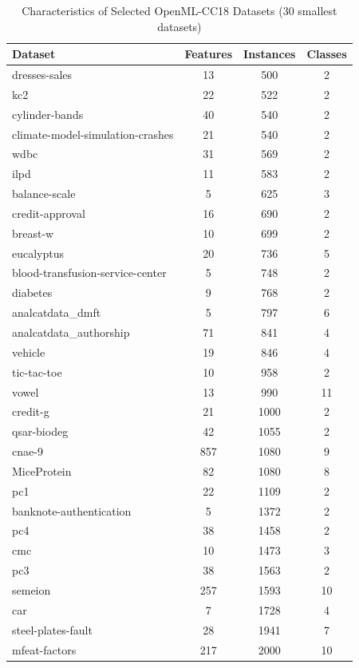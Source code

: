 \documentclass[12pt]{article}
\begin{document}
\begin{table}[ht]
\centering
\footnotesize
\caption{Characteristics of Selected OpenML-CC18 Datasets (30 smallest datasets)}
\label{tab:datasets}
\begin{tabular}{@{}lccc@{}}
\toprule
Dataset & Features & Instances & Classes \\
\midrule
dresses-sales & 13 & 500 & 2 \\
kc2 & 22 & 522 & 2 \\
cylinder-bands & 40 & 540 & 2 \\
climate-model-simulation-crashes & 21 & 540 & 2 \\
wdbc & 31 & 569 & 2 \\
ilpd & 11 & 583 & 2 \\
balance-scale & 5 & 625 & 3 \\
credit-approval & 16 & 690 & 2 \\
breast-w & 10 & 699 & 2 \\
eucalyptus & 20 & 736 & 5 \\
blood-transfusion-service-center & 5 & 748 & 2 \\
diabetes & 9 & 768 & 2 \\
analcatdata\_dmft & 5 & 797 & 6 \\
analcatdata\_authorship & 71 & 841 & 4 \\
vehicle & 19 & 846 & 4 \\
tic-tac-toe & 10 & 958 & 2 \\
vowel & 13 & 990 & 11 \\
credit-g & 21 & 1000 & 2 \\
qsar-biodeg & 42 & 1055 & 2 \\
cnae-9 & 857 & 1080 & 9 \\
MiceProtein & 82 & 1080 & 8 \\
pc1 & 22 & 1109 & 2 \\
banknote-authentication & 5 & 1372 & 2 \\
pc4 & 38 & 1458 & 2 \\
cmc & 10 & 1473 & 3 \\
pc3 & 38 & 1563 & 2 \\
semeion & 257 & 1593 & 10 \\
car & 7 & 1728 & 4 \\
steel-plates-fault & 28 & 1941 & 7 \\
mfeat-factors & 217 & 2000 & 10 \\
\bottomrule
\end{tabular}
\end{table}
\end{document}
